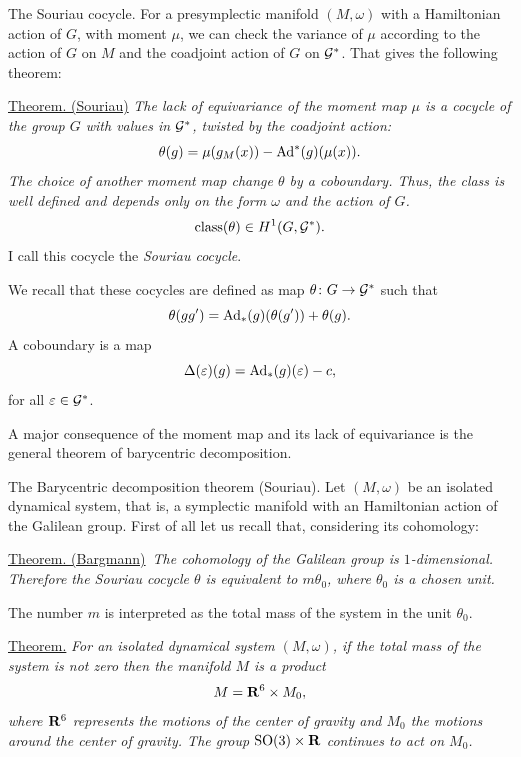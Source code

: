 \begin{Article}{The Souriau cocycle.}{}
  For a presymplectic manifold $(M,\omega)$ with a Hamiltonian action of $G$,
  with moment $\mu$,
  we can check the variance of $\mu$ according to the action of $G$ on $M$ and the coadjoint action of $G$ on $\mathcal{G}^*$.
  That gives the following theorem:
  
  \uline{Theorem. (Souriau)} {\itshape The lack of equivariance of the moment map $\mu$ is a cocycle of the group $G$ with values in $\mathcal{G}^*$,
  twisted by the coadjoint action:
  $$%
    \theta(g) = \mu(g_M(x)) - \Ad^*(g)(\mu(x)).
    $$%
  The choice of another moment map change $\theta$ by a coboundary.
  Thus,
  the class is well defined and depends only on the form $\omega$ and the action of $G$.
  $$%
    \Class(\theta) \in H^1(G, \cG^*).
    $$%
  }
  I call this cocycle the \emph{Souriau cocycle}.
  
  We recall that these cocycles are defined as map $\theta \colon G \to \mathcal{G}^*$ such that
  $$%
    \theta(gg') = \Ad_*(g)(\theta(g')) + \theta(g).
    $$%
  A coboundary is a map
  $$%
    \Delta(\epsilon)(g) = \Ad_*(g)(\epsilon) - c,
    $$%
  for all $\varepsilon \in \mathcal{G}^*$.
  
  A major consequence of the moment map and its lack of equivariance is the general theorem of barycentric decomposition.
\end{Article}

\begin{Article}{The Barycentric decomposition theorem (Souriau).}{}
  Let $(M,\omega)$%
  \linebreak%
  be  an isolated dynamical system,
  that is,
  a symplectic manifold with an Hamiltonian action of the Galilean group.
  First of all let us recall that,
  considering its cohomology:
  
  \uline{Theorem. (Bargmann)}~{\itshape The cohomology of the Galilean group is $1$-dimensional.
  Therefore the Souriau cocycle $\theta$ is equivalent to $m \theta_0$,
  where $\theta_0$ is a chosen unit.}
  
  The number $m$ is interpreted as the total mass of the system in the unit $\theta_0$.
  
  \uline{Theorem.} {\itshape For an isolated dynamical system $(M,\omega)$,
  if the total mass of the system is not zero then the manifold $M$ is a product
  $$%
    M = \RR^6 \times M_0,
    $$%
  where $\mathbf{R}^6$ represents the motions of the center of gravity and $M_0$ the motions around the center of gravity.
  The group $\mathrm{SO}(3) \times \mathbf{R}$ continues to act on $M_0$.
  }
\end{Article}

